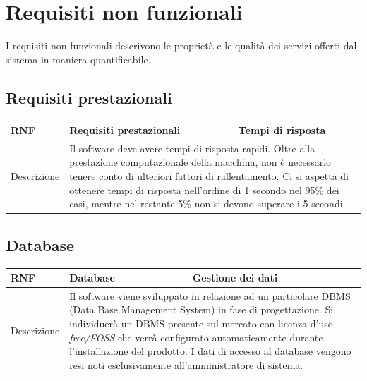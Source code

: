 \documentclass{scrreprt}
\begin{document}
\section{Requisiti non funzionali}
I requisiti non funzionali descrivono le proprietà e le qualità dei servizi offerti dal sistema in maniera quantificabile.


	\subsection{Requisiti prestazionali}
	
	
	\FloatBarrier
	\begin{table}[h|]
	\centering
	\begin{tabular}{|l|p{6cm}|p{6cm}|}
	\hline
	\textbf{RNF\thernf} & \textbf{Requisiti prestazionali} & \textbf{Tempi di risposta} \\ \hline
	Descrizione  & \multicolumn{2}{p{12cm}|}{ Il software deve avere tempi di risposta rapidi. Oltre alla prestazione computazionale della macchina, non è necessario tenere conto di ulteriori fattori di rallentamento. Ci si aspetta di ottenere tempi di risposta nell'ordine di 1 secondo nel 95\% dei casi, mentre nel restante 5\% non si devono superare i 5 secondi. }                  \\ \hline
	\end{tabular}
	\end{table}
	\FloatBarrier


	\subsection{Database}
	\FloatBarrier
		\begin{table}[h|]
	\centering
	\begin{tabular}{|l|p{6cm}|p{6cm}|}
	\hline
	\textbf{RNF\thernf} & \textbf{Database} & \textbf{Gestione dei dati} \\ \hline
	Descrizione  & \multicolumn{2}{p{12cm}|}{Il software viene sviluppato in relazione ad un particolare DBMS (Data Base Management System) in fase di progettazione. Si individuerà un DBMS presente sul mercato con licenza d'uso \textit{free/FOSS} che verrà configurato automaticamente durante l'installazione del prodotto. I dati di accesso al database vengono resi noti esclusivamente all'amministratore di sistema. }                  \\ \hline
	\end{tabular}
	\end{table}
	\FloatBarrier
\end{document}

